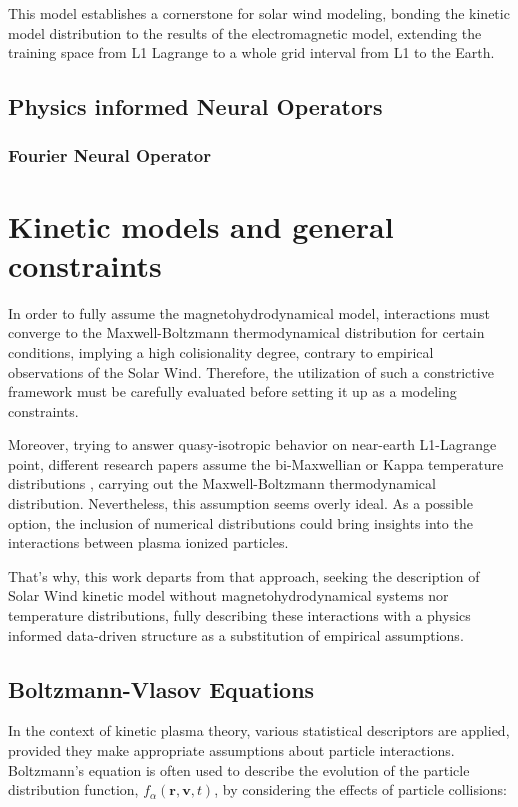 \documentclass[12pt]{article}
\begin{document}
This model establishes a cornerstone for solar wind modeling, bonding the kinetic model distribution to the results of the electromagnetic model, extending the training space from     L1 Lagrange to a whole grid interval from L1 to the Earth.

\subsection{Physics informed Neural Operators}

\subsubsection{Fourier Neural Operator}

\section{Kinetic models and general constraints}
In order to fully assume the magnetohydrodynamical model, interactions must converge to the Maxwell-Boltzmann thermodynamical distribution for certain conditions, implying a high colisionality degree, contrary to empirical observations of the Solar Wind. Therefore, the utilization of such a constrictive framework must be carefully evaluated before setting it up as a modeling constraints.

Moreover, trying to answer quasy-isotropic behavior on near-earth L1-Lagrange point, different research papers assume the bi-Maxwellian or Kappa temperature distributions \cite{Stansby_2018, Nicolaou_2018, Zouganelis_2004}, carrying out the Maxwell-Boltzmann thermodynamical distribution. Nevertheless, this assumption seems overly ideal. As a possible option, the inclusion of numerical distributions could bring insights into the interactions between plasma ionized particles.

That's why, this work departs from that approach, seeking the description of Solar Wind kinetic model without magnetohydrodynamical systems nor temperature distributions, fully describing these interactions with a physics informed data-driven structure as a substitution of empirical assumptions.

\subsection{Boltzmann-Vlasov Equations}

In the context of kinetic plasma theory, various statistical descriptors are applied, provided they make appropriate assumptions about particle interactions. Boltzmann's equation is often used to describe the evolution of the particle distribution function, $f_\alpha(\mathbf{r}, \mathbf{v}, t)$, by considering the effects of particle collisions:
\end{document}
